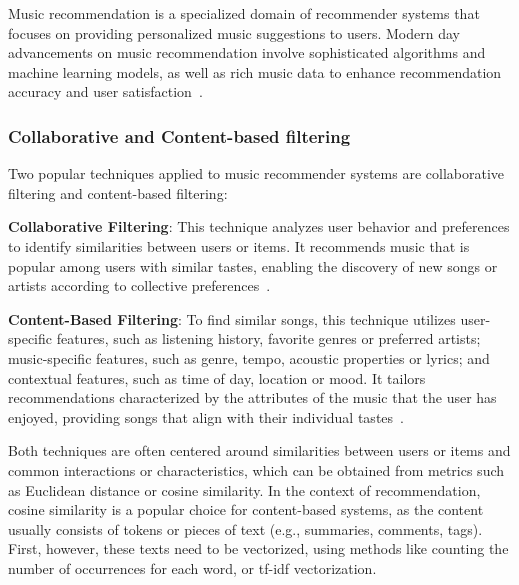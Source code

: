 Music recommendation is a specialized domain of recommender systems that focuses on providing personalized music suggestions to users. Modern day advancements on music recommendation involve sophisticated algorithms and machine learning models, as well as rich music data to enhance recommendation accuracy and user satisfaction~\cite{CHAPTER:RS-HANDBOOK-MUSIC}.

\subsubsection{Collaborative and Content-based filtering}

Two popular techniques applied to music recommender systems are collaborative filtering and content-based filtering:

\begin{compactitem}[\textbullet]
\item \textbf{Collaborative Filtering}: This technique analyzes user behavior and preferences to identify similarities between users or items. It recommends music that is popular among users with similar tastes, enabling the discovery of new songs or artists according to collective preferences~\cite[Chapter 3.1]{CHAPTER:RS-HANDBOOK-MUSIC}.

\item \textbf{Content-Based Filtering}: To find similar songs, this technique utilizes user-specific features, such as listening history, favorite genres or preferred artists; music-specific features, such as genre, tempo, acoustic properties or lyrics; and contextual features, such as time of day, location or mood. It tailors recommendations characterized by the attributes of the music that the user has enjoyed, providing songs that align with their individual tastes~\cite[Chapter 3.2]{CHAPTER:RS-HANDBOOK-MUSIC}.

\end{compactitem}

Both techniques are often centered around similarities between users or items and common interactions or characteristics, which can be obtained from metrics such as Euclidean distance or cosine similarity. In the context of recommendation, cosine similarity is a popular choice for content-based systems, as the content usually consists of tokens or pieces of text (e.g., summaries, comments, tags). First, however, these texts need to be vectorized, using methods like counting the number of occurrences for each word, or \acs{tf}-\acs{idf} vectorization.

